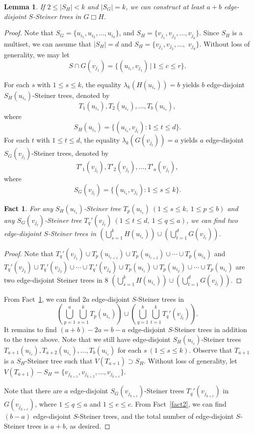 \documentclass[final]{dmtcs-episciences}
\newtheorem{lemma}{Lemma}[section]
\newtheorem{fact}{Fact}
\begin{document}
\begin{lemma}\label{lem2-2}
If $2\leq |S_H|<k$ and $|S_G|=k$, we can construct at
least $a+b$ edge-disjoint $S$-Steiner trees in $G\Box H$.
\end{lemma}
\begin{proof}
Note that $S_G=\{u_{i_1},u_{i_2},\ldots,u_{i_k}\}$, and
$S_H=\{v_{j_1},v_{j_2},\ldots,v_{j_k}\}$. Since $S_H$ is a
multiset, we can assume that $|S_H|=d$ and
$S_H=\{v_{j_1},v_{j_2},\ldots,$ $v_{j_d}\}$. Without loss of
generality, we may let
\[
S\cap G(v_{j_1})=\{(u_{i_c},v_{j_1})\,|\,1\leq c\leq r\}.
\]

For each $s$ with $1\leq s\leq k$, the equality
$\lambda_k(H(u_{i_s}))=b$ yields $b$ edge-disjoint
$S_H(u_{i_s})$-Steiner trees, denoted by
\[
T_1(u_{i_s}),T_2(u_{i_s}),\ldots,T_b(u_{i_s}),
\]
where
\[
S_H(u_{i_s})=\{(u_{i_s},v_{j_t}):1\leq t\leq d\}.
\]
For each $t$ with $1\leq t\leq d$, the equality
$\lambda_k(G(v_{j_t}))=a$ yields $a$ edge-disjoint
$S_G(v_{j_t})$-Steiner trees, denoted by
\[
T'_1(v_{j_t}),T'_2(v_{j_t}),\ldots,T'_a(v_{j_t}),
\]
where
\[
S_G(v_{j_t})=\{(u_{i_s},v_{j_t}):1\leq s\leq k\}.
\]

\begin{fact}\label{fact3}
For any $S_H(u_{i_s})$-Steiner tree $T_p(u_{i_s}) \ (1\leq s\leq k,
\ 1\leq p\leq b)$ and any $S_G(v_{j_t})$-Steiner tree $T_q'(v_{j_t})
\ (1\leq t\leq d, \ 1\leq q\leq a)$, we can find two edge-disjoint
$S$-Steiner trees in $(\bigcup_{s=1}^kH(u_{i_s}))\cup
(\bigcup_{t=1}^dG(v_{j_t}))$.
\end{fact}
\begin{proof}
Note that $T_q'(v_{j_1})\cup T_p(u_{i_{r+1}})\cup
T_p(u_{i_{r+2}})\cup \cdots \cup T_p(u_{i_k})$ and
$T_q'(v_{j_2})\cup T_q'(v_{j_3})\cup \cdots \cup T_q'(v_{j_d})\cup
T_p(u_{i_1})\cup T_p(u_{i_2})\cup \cdots \cup T_p(u_{i_r})$ are two
edge-disjoint Steiner trees in 8
$\left(\bigcup_{s=1}^kH(u_{i_s})\right)\cup
\left(\bigcup_{t=1}^dG(v_{j_t})\right)$.
\end{proof}


From Fact~\ref{fact3}, we can find $2a$ edge-disjoint $S$-Steiner
trees in
\[
\left(\bigcup_{p=1}^{a}\bigcup_{s=1}^kT_p(u_{i_s})\right)\cup
\left(\bigcup_{q=1}^{b}\bigcup_{t=1}^kT_q'(v_{j_t})\right).
\]
It remains to find $(a+b)-2a=b-a$ edge-disjoint $S$-Steiner trees
in addition to the trees above. Note that we still have edge-disjoint
$S_H(u_{i_s})$-Steiner trees
$T_{a+1}(u_{i_s}),T_{a+2}(u_{i_s}),\ldots,T_{b}(u_{i_s})$ for each
$s \ (1\leq s\leq k)$. Observe that $T_{a+1}$ is a $S_H$-Steiner
tree such that $V(T_{a+1})\supset S_H$. Without loss of generality,
let $V(T_{a+1})-S_H=\{v_{j_{k+1}},v_{j_{k+2}},\ldots,v_{j_{k+c}}\}$.

Note that there are $a$ edge-disjoint $S_G(v_{j_{k+e}})$-Steiner
trees $T_q'(v_{j_{k+e}})$ in $G(v_{j_{k+e}})$, where $1\leq q\leq a$
and $1\leq e\leq c$. From Fact~\ref{fact2}, we can find $(b-a)$
edge-disjoint $S$-Steiner trees, and the total number of
edge-disjoint $S$-Steiner trees is $a+b$, as desired.
\end{proof}
\end{document}
